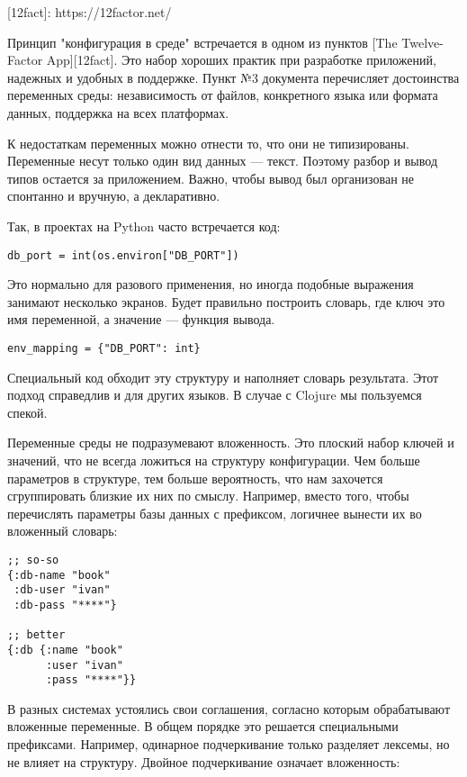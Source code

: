 [12fact]: https://12factor.net/

Принцип "конфигурация в среде" встречается в одном из пунктов [The Twelve-Factor
App][12fact]. Это набор хороших практик при разработке приложений, надежных и
удобных в поддержке. Пункт №3 документа перечисляет достоинства переменных
среды: независимость от файлов, конкретного языка или формата данных, поддержка
на всех платформах.

К недостаткам переменных можно отнести то, что они не типизированы. Переменные
несут только один вид данных — текст. Поэтому разбор и вывод типов остается за
приложением. Важно, чтобы вывод был организован не спонтанно и вручную, а
декларативно.

Так, в проектах на Python часто встречается код:

\begin{verbatim}
db_port = int(os.environ["DB_PORT"])
\end{verbatim}

Это нормально для разового применения, но иногда подобные выражения занимают
несколько экранов. Будет правильно построить словарь, где ключ это имя
переменной, а значение — функция вывода.

\begin{verbatim}
env_mapping = {"DB_PORT": int}
\end{verbatim}

Специальный код обходит эту структуру и наполняет словарь результата. Этот
подход справедлив и для других языков. В случае с Clojure мы пользуемся спекой.

Переменные среды не подразумевают вложенность. Это плоский набор ключей и
значений, что не всегда ложиться на структуру конфигурации. Чем больше
параметров в структуре, тем больше вероятность, что нам захочется сгруппировать
близкие их них по смыслу. Например, вместо того, чтобы перечислять параметры
базы данных с префиксом, логичнее вынести их во вложенный словарь:

\begin{verbatim}
;; so-so
{:db-name "book"
 :db-user "ivan"
 :db-pass "****"}

;; better
{:db {:name "book"
      :user "ivan"
      :pass "****"}}
\end{verbatim}

В разных системах устоялись свои соглашения, согласно которым обрабатывают
вложенные переменные. В общем порядке это решается специальными
префиксами. Например, одинарное подчеркивание только разделяет лексемы, но не
влияет на структуру. Двойное подчеркивание означает вложенность:

